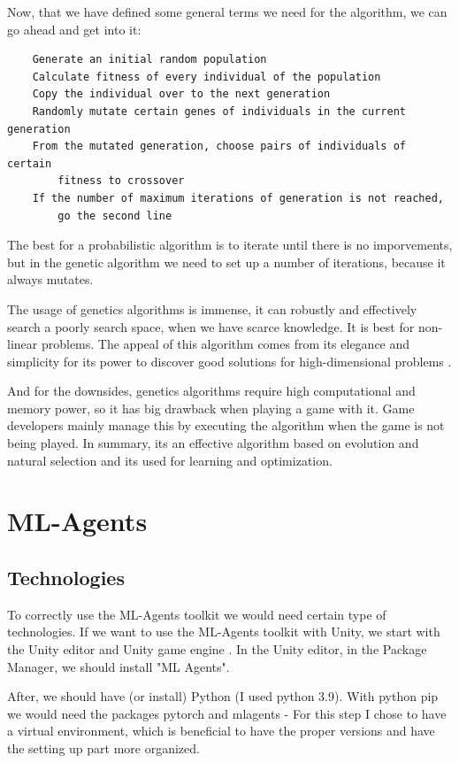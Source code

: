 \documentclass[a4paper, 12pt]{book}
\begin{document}
\clearpage

Now, that we have defined some general terms we need for the algorithm, we can go ahead and get into it:

\begin{verbatim}
    Generate an initial random population
    Calculate fitness of every individual of the population
    Copy the individual over to the next generation
    Randomly mutate certain genes of individuals in the current generation
    From the mutated generation, choose pairs of individuals of certain 
        fitness to crossover
    If the number of maximum iterations of generation is not reached, 
        go the second line
\end{verbatim}

The best for a probabilistic algorithm is to iterate until there is no imporvements, but in the genetic algorithm we need to set up a number of iterations, because it always mutates.

The usage of genetics algorithms is immense, it can robustly and effectively search a poorly search space, when we have scarce knowledge. It is best for non-linear problems. The appeal of this algorithm comes from its elegance and simplicity for its power to discover good solutions for high-dimensional problems \cite{CurrentAIGames}.

And for the downsides, genetics algorithms require high computational and memory power, so it has big drawback when playing a game with it. Game developers mainly manage this by executing the algorithm when the game is not being played. In summary, its an effective algorithm based on evolution and natural selection and its used for learning and optimization.

\chapter{ML-Agents}
\label{ch3}

\section{Technologies}

To correctly use the ML-Agents toolkit we would need certain type of technologies. If we want to use the ML-Agents toolkit with Unity, we start with the Unity editor and Unity game engine \cite{UnitySoftware}. In the Unity editor, in the Package Manager, we should install "ML Agents".

After, we should have (or install) Python \cite{PythonManual} (I used python 3.9). With python pip we would need the packages pytorch and mlagents - For this step I chose to have a virtual environment, which is beneficial to have the proper versions and have the setting up part more organized.
\end{document}
